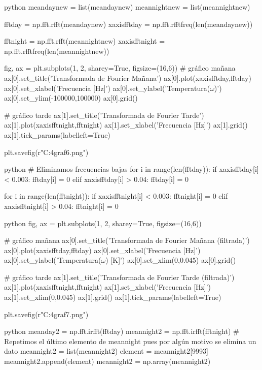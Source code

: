 \begin{sourcecode}[\label{codigo-python}]{python}
meandaynew = list(meandaynew)
meannightnew = list(meannightnew)

fftday = np.fft.rfft(meandaynew)
xaxisfftday = np.fft.rfftfreq(len(meandaynew))

fftnight = np.fft.rfft(meannightnew)
xaxisfftnight = np.fft.rfftfreq(len(meannightnew))

fig, ax = plt.subplots(1, 2, sharey=True, figsize=(16,6))
# gráfico mañana
ax[0].set_title('Transformada de Fourier Mañana')
ax[0].plot(xaxisfftday,fftday)
ax[0].set_xlabel('Frecuencia [Hz]')
ax[0].set_ylabel('Temperatura($\omega$)')
ax[0].set_ylim(-100000,100000)
ax[0].grid()

# gráfico tarde
ax[1].set_title('Transformada de Fourier Tarde')
ax[1].plot(xaxisfftnight,fftnight)
ax[1].set_xlabel('Frecuencia [Hz]')
ax[1].grid()
ax[1].tick_params(labelleft=True)

plt.savefig(r"C:\Users\Usuario\Downloads\inf4graf6.png")
\end{sourcecode}

\begin{sourcecode}[\label{codigo-python}]{python}
# Eliminamos frecuencias bajas
for i in range(len(fftday)):
    if xaxisfftday[i] < 0.003:
        fftday[i] = 0
    elif xaxisfftday[i] > 0.04:
        fftday[i] = 0
        
for i in range(len(fftnight)):
    if xaxisfftnight[i] < 0.003:
        fftnight[i] = 0
    elif xaxisfftnight[i] > 0.04:
        fftnight[i] = 0
\end{sourcecode}

\begin{sourcecode}[\label{codigo-python}]{python}
fig, ax = plt.subplots(1, 2, sharey=True, figsize=(16,6))

# gráfico mañana
ax[0].set_title('Transformada de Fourier Mañana (filtrada)')
ax[0].plot(xaxisfftday,fftday)
ax[0].set_xlabel('Frecuencia [Hz]')
ax[0].set_ylabel('Temperatura($\omega$) [K]')
ax[0].set_xlim(0,0.045)
ax[0].grid()

# gráfico tarde
ax[1].set_title('Transformada de Fourier Tarde (filtrada)')
ax[1].plot(xaxisfftnight,fftnight)
ax[1].set_xlabel('Frecuencia [Hz]')
ax[1].set_xlim(0,0.045)
ax[1].grid()
ax[1].tick_params(labelleft=True)

plt.savefig(r"C:\Users\Usuario\Downloads\inf4graf7.png")
\end{sourcecode}

\begin{sourcecode}[\label{codigo-python}]{python}
meanday2 = np.fft.irfft(fftday)
meannight2 = np.fft.irfft(fftnight)
# Repetimos el último elemento de meannight pues por algún motivo se elimina un dato
meannight2 = list(meannight2)
element = meannight2[9993]
meannight2.append(element)
meannight2 = np.array(meannight2)
\end{sourcecode}

